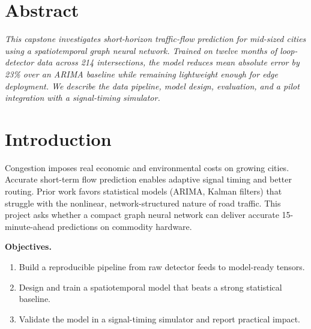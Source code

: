 \documentclass[11pt]{article}
\begin{document}

\vspace{4pt}
\section*{\normalsize\color{ink}Abstract}
\vspace{-4pt}
\noindent\textit{This capstone investigates short-horizon traffic-flow prediction for
mid-sized cities using a spatiotemporal graph neural network. Trained on twelve months of
loop-detector data across 214 intersections, the model reduces mean absolute error by 23\%
over an ARIMA baseline while remaining lightweight enough for edge deployment. We describe
the data pipeline, model design, evaluation, and a pilot integration with a signal-timing
simulator.}

\section{Introduction}
Congestion imposes real economic and environmental costs on growing cities. Accurate
short-term flow prediction enables adaptive signal timing and better routing. Prior work
favors statistical models (ARIMA, Kalman filters) that struggle with the nonlinear,
network-structured nature of road traffic. This project asks whether a compact graph
neural network can deliver accurate 15-minute-ahead predictions on commodity hardware.

\textbf{Objectives.}
\begin{enumerate}[leftmargin=1.4em,itemsep=2pt]
  \item Build a reproducible pipeline from raw detector feeds to model-ready tensors.
  \item Design and train a spatiotemporal model that beats a strong statistical baseline.
  \item Validate the model in a signal-timing simulator and report practical impact.
\end{enumerate}
\end{document}
